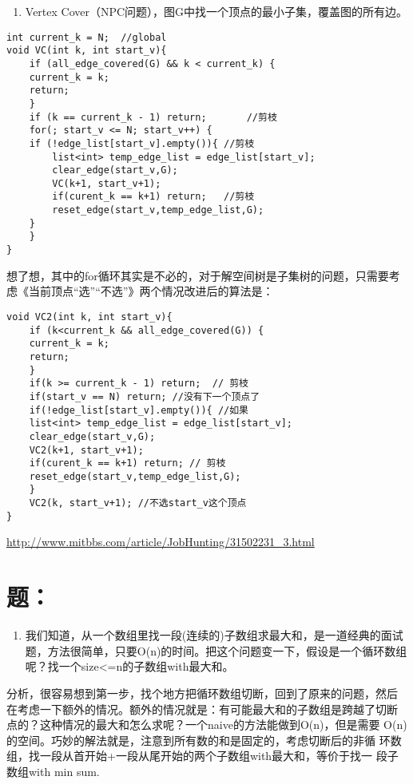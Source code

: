 \documentclass[12pt]{book}
\begin{document}
\begin{enumerate}
\item Vertex Cover（NPC问题），图G中找一个顶点的最小子集，覆盖图的所有边。
\end{enumerate}
\lstset{language=java,label= ,caption= ,numbers=none}
\begin{lstlisting}
int current_k = N;  //global
void VC(int k, int start_v){
    if (all_edge_covered(G) && k < current_k) {
	current_k = k;
	return;
    }
    if (k == current_k - 1) return;       //剪枝
    for(; start_v <= N; start_v++) {
	if (!edge_list[start_v].empty()){ //剪枝
	    list<int> temp_edge_list = edge_list[start_v];
	    clear_edge(start_v,G);
	    VC(k+1, start_v+1);
	    if(curent_k == k+1) return;   //剪枝
	    reset_edge(start_v,temp_edge_list,G);
	}
    }
}
\end{lstlisting}

想了想，其中的for循环其实是不必的，对于解空间树是子集树的问题，只需要考虑《当前顶点“选”“不选”》两个情况改进后的算法是：
\lstset{language=java,label= ,caption= ,numbers=none}
\begin{lstlisting}
void VC2(int k, int start_v){
    if (k<current_k && all_edge_covered(G)) {
	current_k = k;
	return;
    }
    if(k >= current_k - 1) return;  // 剪枝
    if(start_v == N) return; //没有下一个顶点了
    if(!edge_list[start_v].empty()){ //如果
	list<int> temp_edge_list = edge_list[start_v];
	clear_edge(start_v,G);
	VC2(k+1, start_v+1);
	if(curent_k == k+1) return; // 剪枝
	reset_edge(start_v,temp_edge_list,G);
    }
    VC2(k, start_v+1); //不选start_v这个顶点
}
\end{lstlisting}

\url{http://www.mitbbs.com/article/JobHunting/31502231_3.html}

\section{题：}
\label{sec-18-4}

\begin{enumerate}
\item 我们知道，从一个数组里找一段(连续的)子数组求最大和，是一道经典的面试题，方法很简单，只要O(n)的时间。把这个问题变一下，假设是一个循环数组呢？找一个size<=n的子数组with最大和。
\end{enumerate}

分析，很容易想到第一步，找个地方把循环数组切断，回到了原来的问题，然后
在考虑一下额外的情况。额外的情况就是：有可能最大和的子数组是跨越了切断
点的？这种情况的最大和怎么求呢？一个naive的方法能做到O(n)，但是需要
O(n)的空间。巧妙的解法就是，注意到所有数的和是固定的，考虑切断后的非循
环数组，找一段从首开始+一段从尾开始的两个子数组with最大和，等价于找一
段子数组with min sum.
\end{document}
